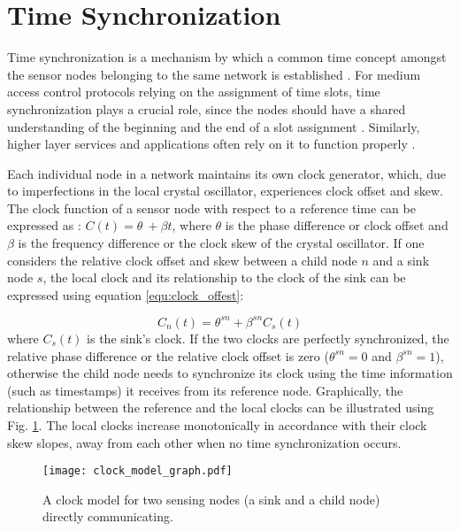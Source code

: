 \section{Time Synchronization}
\label{sec:ts}

Time synchronization is a mechanism by which a common time concept amongst the sensor nodes belonging to the same network is established \cite{wu_clock_synch}. For medium access control protocols relying on the assignment of time slots, time synchronization plays a crucial role, since the nodes should have a shared understanding of the beginning and the end of a slot assignment \cite{romanov2020precise}. Similarly, higher layer services and applications often rely on it to function properly \cite{bhushan2020requirements}. 

Each individual node in a network maintains its own clock generator, which, due to imperfections in the local crystal oscillator, experiences clock offset and skew. The clock function of a sensor node with respect to a reference time can be expressed as : $C(t) = \theta \ + \beta t$, where $\theta$ is the phase difference or clock offset and $\beta$ is the frequency difference or the clock skew of the crystal oscillator. If one considers the relative clock offset and skew between a child node $n$ and a sink node $s$, the local clock  and its relationship to the clock of the sink can be expressed using equation \ref{equ:clock_offest}:

                \begin{equation}                 
                C_{n}(t) = \theta^{sn}+\beta^{sn}C_{s}(t)                                       
                \label{equ:clock_offest}         
                \end{equation}
where $C_{s}(t)$ is the sink's clock. If the two clocks are perfectly synchronized, the relative phase difference or the relative clock offset is zero ($\theta^{sn} = 0 $ and  $\beta^{sn}=1$), otherwise the child node needs to synchronize its clock using the time information (such as timestamps) it receives from its reference node. Graphically, the relationship between the reference and the local clocks can be illustrated using Fig. \ref{fig:clock_model}. The local clocks increase monotonically in accordance with their clock skew slopes, away from each other when no time synchronization occurs.

\begin{figure}[h!]
	\centering
	\texttt{[image: clock\_model\_graph.pdf]}
	\caption{A clock model for two sensing nodes (a sink and a child node) directly communicating.}
\label{fig:clock_model}
\end{figure}

